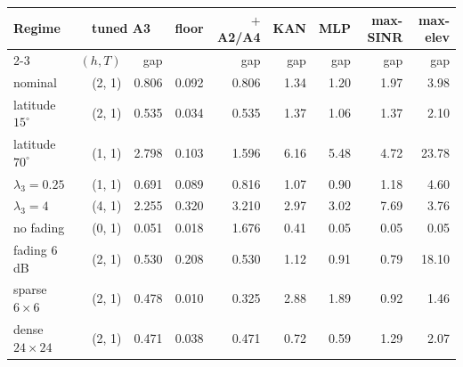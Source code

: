 \footnotesize
\setlength{\tabcolsep}{3.6pt}
\begin{tabular}{@{}lrrrrrrrr@{}}
\toprule
Regime & \multicolumn{2}{c}{tuned A3} & floor & $+$A2/A4 & KAN & MLP & {\scriptsize max-SINR} & {\scriptsize max-elev} \\
\cmidrule(lr){2-3}
 & $(h,T)$ & gap & & gap & gap & gap & gap & gap \\
\midrule
nominal & (2, 1) & 0.806 & 0.092 & 0.806 & 1.34 & 1.20 & 1.97 & 3.98 \\
latitude $15^\circ$ & (2, 1) & 0.535 & 0.034 & 0.535 & 1.37 & 1.06 & 1.37 & 2.10 \\
latitude $70^\circ$ & (1, 1) & 2.798 & 0.103 & 1.596 & 6.16 & 5.48 & 4.72 & 23.78 \\
$\lambda_3=0.25$ & (1, 1) & 0.691 & 0.089 & 0.816 & 1.07 & 0.90 & 1.18 & 4.60 \\
$\lambda_3=4$ & (4, 1) & 2.255 & 0.320 & 3.210 & 2.97 & 3.02 & 7.69 & 3.76 \\
no fading & (0, 1) & 0.051 & 0.018 & 1.676 & 0.41 & 0.05 & 0.05 & 0.05 \\
fading 6\,dB & (2, 1) & 0.530 & 0.208 & 0.530 & 1.12 & 0.91 & 0.79 & 18.10 \\
sparse $6{\times}6$ & (2, 1) & 0.478 & 0.010 & 0.325 & 2.88 & 1.89 & 0.92 & 1.46 \\
dense $24{\times}24$ & (2, 1) & 0.471 & 0.038 & 0.471 & 0.72 & 0.59 & 1.29 & 2.07 \\
\bottomrule
\end{tabular}
